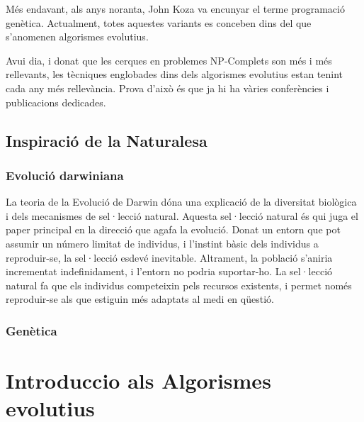 \documentclass[a4paper]{article}
\begin{document}
Més endavant, als anys noranta, John Koza va encunyar el terme programació
genètica.  Actualment, totes aquestes variants es conceben dins del que
s'anomenen algorismes evolutius.


Avui dia, i donat que les cerques en problemes NP-Complets son més i més
rellevants, les tècniques englobades dins dels algorismes evolutius estan tenint
cada any més rellevància.  Prova d'això és que ja hi ha vàries conferències
i publicacions dedicades.

\subsection{Inspiració de la Naturalesa} %
\label{sub:Inspiracio de la Naturalesa}

\subsubsection{Evolució darwiniana} %
\label{ssub:Evolucio darwiniana}

La teoria de la Evolució de Darwin \cite{Darwin} dóna una explicació de la
diversitat biològica i dels mecanismes de sel·lecció natural.  Aquesta
sel·lecció natural és qui juga el paper principal en la direcció que agafa la
evolució.  Donat un entorn que pot assumir un número limitat de individus, i
l'instint bàsic dels individus a reproduir-se, la sel·lecció esdevé inevitable.
Altrament, la població s'aniria incrementat indefinidament, i l'entorn no podria
suportar-ho.  La sel·lecció natural fa que els individus competeixin pels
recursos existents, i permet només reproduir-se als que estiguin més adaptats al
medi en qüestió.

\subsubsection{Genètica} %
\label{ssub:Genetica}




\section{Introduccio als Algorismes evolutius} %
\label{sec:Introduccio als AE}
\end{document}
